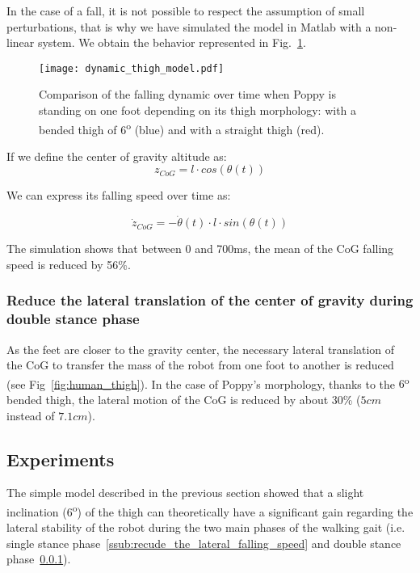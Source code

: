In the case of a fall, it is not possible to respect the assumption of small perturbations, that is
why we have simulated the model in Matlab with a non-linear system. We obtain the behavior
represented in Fig.~\ref{fig:dynamic_thigh_model}.

\begin{figure}[thpb]
    \centering
    \texttt{[image: dynamic\_thigh\_model.pdf]}
    \caption{Comparison of the falling dynamic over time when Poppy is standing on one foot depending on  its thigh morphology: with a bended thigh of 6\textsuperscript{o} (blue) and with a straight thigh (red).}
    \label{fig:dynamic_thigh_model}
\end{figure}

If we define the center of gravity altitude as:
$$ z_{CoG} = l \cdot cos(\theta(t)) $$


We can express its falling speed over time as:

$$ \dot{z}_{CoG} = - \dot{\theta}(t) \cdot l \cdot sin(\theta(t))$$


The simulation shows that between 0 and 700ms, the mean of the CoG falling speed is reduced by 56\%.

\subsubsection{Reduce the lateral translation of the center of gravity during double stance phase} %
\label{ssub:reduce_the_lateral_translation_of_the_center_of_gravity}

As the feet are closer to the gravity center, the necessary lateral translation of the CoG to transfer the mass of the robot from one foot to another is reduced (see Fig~\ref{fig:human_thigh}). In the case of Poppy's morphology, thanks to the $6$\textsuperscript{o} bended thigh, the lateral motion of the CoG is reduced by about 30\% ($ 5 cm$ instead of $7.1 cm$).


\subsection{Experiments} %
\label{sub:experiments}
The simple model described in the previous section showed that a slight inclination
(6\textsuperscript{o}) of the thigh can theoretically have a significant gain regarding the lateral
stability of the robot during the two main phases of the walking gait (i.e. single stance
phase~\ref{ssub:recude_the_lateral_falling_speed} and double stance
phase~\ref{ssub:reduce_the_lateral_translation_of_the_center_of_gravity}).

